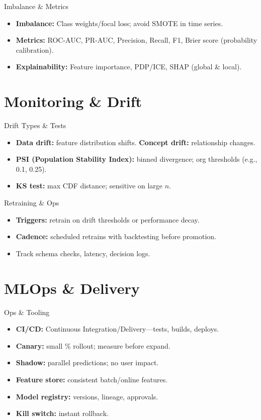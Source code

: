 \documentclass[aspectratio=169]{beamer}
\begin{document}
\begin{frame}{Imbalance \& Metrics}
  \begin{itemize}
    \item \textbf{Imbalance:} Class weights/focal loss; avoid SMOTE in time series.
    \item \textbf{Metrics:} ROC-AUC, PR-AUC, Precision, Recall, F1, Brier score (probability calibration).
    \item \textbf{Explainability:} Feature importance, PDP/ICE, SHAP (global \& local).
  \end{itemize}
\end{frame}

\section{Monitoring \& Drift}
\begin{frame}{Drift Types \& Tests}
  \begin{itemize}
    \item \textbf{Data drift:} feature distribution shifts. \textbf{Concept drift:} relationship changes.
    \item \textbf{PSI (Population Stability Index):} binned divergence; org thresholds (e.g., 0.1, 0.25).
    \item \textbf{KS test:} max CDF distance; sensitive on large $n$.
  \end{itemize}
\end{frame}

\begin{frame}{Retraining \& Ops}
  \begin{itemize}
    \item \textbf{Triggers:} retrain on drift thresholds or performance decay.
    \item \textbf{Cadence:} scheduled retrains with backtesting before promotion.
    \item Track schema checks, latency, decision logs.
  \end{itemize}
\end{frame}

\section{MLOps \& Delivery}
\begin{frame}{Ops \& Tooling}
  \begin{itemize}
    \item \textbf{CI/CD:} Continuous Integration/Delivery---tests, builds, deploys.
    \item \textbf{Canary:} small \% rollout; measure before expand.
    \item \textbf{Shadow:} parallel predictions; no user impact.
    \item \textbf{Feature store:} consistent batch/online features.
    \item \textbf{Model registry:} versions, lineage, approvals.
    \item \textbf{Kill switch:} instant rollback.
  \end{itemize}
\end{frame}
\end{document}
